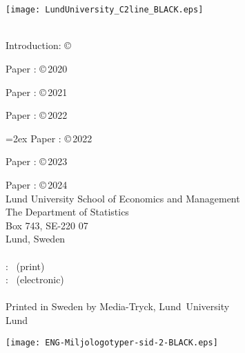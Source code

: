 


\cleardoublepage
\thispagestyle{empty} %
~
\vspace*{0.80cm}
\begin{center}
  {\Huge \myMainTitle}
  \\[4mm]
  {\Large \mySubTitle}

  \vspace*{6ex}

  {\Large\myName}

  \vspace*{6ex}
  \texttt{[image: LundUniversity\_C2line\_BLACK.eps]}
\end{center}
\vfill


\newpage

\thispagestyle{empty} %

\null

\vfill

{\small
  \myCoverFront\\

  \noindent Introduction: \copyright\,\myYear~\myName

  \noindent Paper \I: \copyright\,2020 \PaperIauthor

  \noindent Paper \II: \copyright\,2021 \PaperIIauthor

  \noindent Paper \III: \copyright\,2022 \PaperIIIauthor

  \noindent\hangindent=2ex Paper \IV: \copyright\,2022 \PaperIVauthor

  \noindent Paper \V: \copyright\,2023 \PaperVauthor

  \noindent Paper \VI: \copyright\,2024 \PaperVIauthor\\

  \noindent Lund University School of Economics and Management\\
  The Department of Statistics\\
  Box 743, SE-220 07\\
  Lund, Sweden
  \\
  \\
  \ISBN: \myISBNprint~(print)
  \\
  \ISBN: \myISBNpdf~(electronic)
  \\
  \\
  Printed in Sweden by Media-Tryck, Lund~University\\
  Lund \myYear

  \bigskip

  \noindent\texttt{[image: ENG-Miljologotyper-sid-2-BLACK.eps]}
}
